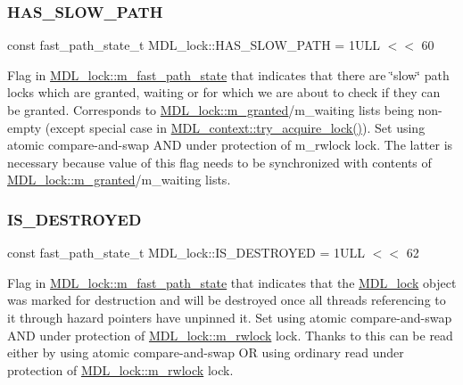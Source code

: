 \subsubsection{\texorpdfstring{H\+A\+S\+\_\+\+S\+L\+O\+W\+\_\+\+P\+A\+TH}{HAS\_SLOW\_PATH}}
{\footnotesize\ttfamily const fast\+\_\+path\+\_\+state\+\_\+t M\+D\+L\+\_\+lock\+::\+H\+A\+S\+\_\+\+S\+L\+O\+W\+\_\+\+P\+A\+TH = 1\+U\+L\+L $<$$<$ 60\hspace{0.3cm}{\ttfamily [static]}}

Flag in \mbox{\hyperlink{classMDL__lock_ae680877b7079a862d294ccbefed6372c}{M\+D\+L\+\_\+lock\+::m\+\_\+fast\+\_\+path\+\_\+state}} that indicates that there are \char`\"{}slow\char`\"{} path locks which are granted, waiting or for which we are about to check if they can be granted. Corresponds to \mbox{\hyperlink{classMDL__lock_a188dd53561f6cf6148277512b706ea74}{M\+D\+L\+\_\+lock\+::m\+\_\+granted}}/m\+\_\+waiting lists being non-\/empty (except special case in \mbox{\hyperlink{classMDL__context_ab6d07a861aaf9db6fda46da196a8b0d0}{M\+D\+L\+\_\+context\+::try\+\_\+acquire\+\_\+lock()}}). Set using atomic compare-\/and-\/swap A\+ND under protection of m\+\_\+rwlock lock. The latter is necessary because value of this flag needs to be synchronized with contents of \mbox{\hyperlink{classMDL__lock_a188dd53561f6cf6148277512b706ea74}{M\+D\+L\+\_\+lock\+::m\+\_\+granted}}/m\+\_\+waiting lists. \mbox{\label{classMDL__lock_a1627af1fd21d2ae76c27b39901e574a3}} 
\subsubsection{\texorpdfstring{I\+S\+\_\+\+D\+E\+S\+T\+R\+O\+Y\+ED}{IS\_DESTROYED}}
{\footnotesize\ttfamily const fast\+\_\+path\+\_\+state\+\_\+t M\+D\+L\+\_\+lock\+::\+I\+S\+\_\+\+D\+E\+S\+T\+R\+O\+Y\+ED = 1\+U\+L\+L $<$$<$ 62\hspace{0.3cm}{\ttfamily [static]}}

Flag in \mbox{\hyperlink{classMDL__lock_ae680877b7079a862d294ccbefed6372c}{M\+D\+L\+\_\+lock\+::m\+\_\+fast\+\_\+path\+\_\+state}} that indicates that the \mbox{\hyperlink{classMDL__lock}{M\+D\+L\+\_\+lock}} object was marked for destruction and will be destroyed once all threads referencing to it through hazard pointers have unpinned it. Set using atomic compare-\/and-\/swap A\+ND under protection of \mbox{\hyperlink{classMDL__lock_a1308b4506d8cb6d754b4f173e3aa4962}{M\+D\+L\+\_\+lock\+::m\+\_\+rwlock}} lock. Thanks to this can be read either by using atomic compare-\/and-\/swap OR using ordinary read under protection of \mbox{\hyperlink{classMDL__lock_a1308b4506d8cb6d754b4f173e3aa4962}{M\+D\+L\+\_\+lock\+::m\+\_\+rwlock}} lock. \mbox{\label{classMDL__lock_aefb48179bc3f6ef64c213b253c379da4}} 
